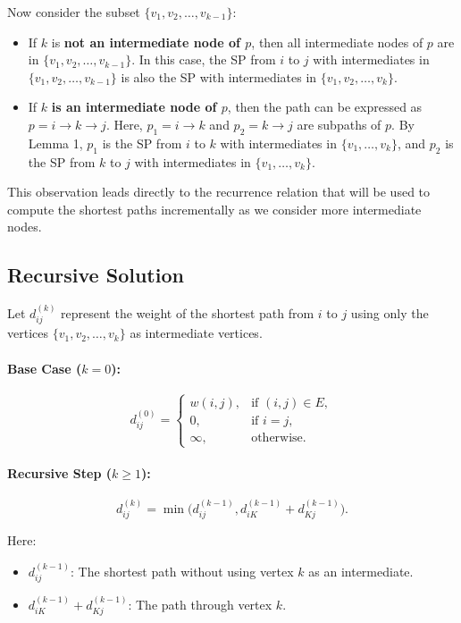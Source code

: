 Now consider the subset \( \{v_1, v_2, \dots, v_{k-1}\} \):
\begin{itemize}
    \item If \( k \) is \textbf{not an intermediate node of \( p \)}, then all intermediate nodes of \( p \) are in \( \{v_1, v_2, \dots, v_{k-1}\} \). In this case, the SP from \( i \) to \( j \) with intermediates in \( \{v_1, v_2, \dots, v_{k-1}\} \) is also the SP with intermediates in \( \{v_1, v_2, \dots, v_k\} \).

    \item If \( k \) \textbf{is an intermediate node of \( p \)}, then the path can be expressed as \( p = i \to k \to j \). Here, \( p_1 = i \to k \) and \( p_2 = k \to j \) are subpaths of \( p \). By Lemma 1, \( p_1 \) is the SP from \( i \) to \( k \) with intermediates in \( \{v_1, \dots, v_k\} \), and \( p_2 \) is the SP from \( k \) to \( j \) with intermediates in \( \{v_1, \dots, v_k\} \).
\end{itemize}

This observation leads directly to the recurrence relation that will be used to compute the shortest paths incrementally as we consider more intermediate nodes.

\subsection{Recursive Solution}
Let \( d^{(k)}_{ij} \) represent the weight of the shortest path from \( i \) to \( j \) using only the vertices \( \{v_1, v_2, \dots, v_k\} \) as intermediate vertices.

\paragraph{Base Case (\( k = 0 \)):}
\[
d^{(0)}_{ij} = 
\begin{cases} 
w(i, j), & \text{if } (i, j) \in E, \\
0, & \text{if } i = j, \\
\infty, & \text{otherwise.}
\end{cases}
\]

\paragraph{Recursive Step (\( k \geq 1 \)):}
\[
d^{(k)}_{ij} = 
\min\big(d^{(k-1)}_{ij}, d^{(k-1)}_{iK} + d^{(k-1)}_{Kj}\big).
\]

Here:
\begin{itemize}
    \item \( d^{(k-1)}_{ij} \): The shortest path without using vertex \( k \) as an intermediate.
    \item \( d^{(k-1)}_{iK} + d^{(k-1)}_{Kj} \): The path through vertex \( k \).
\end{itemize}

